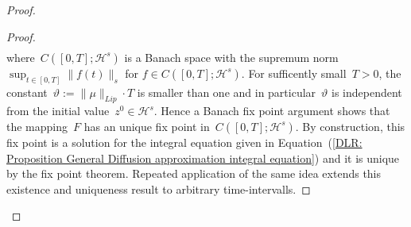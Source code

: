 \begin{proof}
\begin{proof}
\begin{align*}
    \end{align*}
    where~$C([0,T];\mathcal{H}^s)$ is a Banach space with the supremum norm~$\sup_{t \in [0,T]} \| f(t) \|_s $ for $f \in C([0,T];\mathcal{H}^s)$. For sufficently small~$T>0$, the constant~$\vartheta := \| \mu \|_{Lip} \cdot T$ is smaller than one and in particular~$\vartheta $ is independent from the initial value~$z^0 \in \mathcal{H}^s$. Hence a Banach fix point argument shows that the mapping~$F$ has an unique fix point in~$C([0,T];\mathcal{H}^s)$. By construction, this fix point is a solution for the integral equation given in Equation~(\ref{DLR: Proposition General Diffusion approximation integral equation}) and it is unique by the fix point theorem. Repeated application of the same idea extends this existence and uniqueness result to arbitrary time-intervalls. 
    

\end{proof}
\end{proof}
